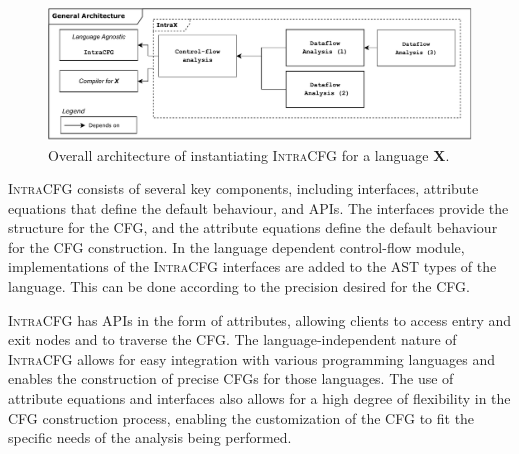 \begin{figure}[H]
    \centering
    \includegraphics[width=1\textwidth]{kappa/img/architecture.pdf}
    \caption{\label{fig:intraCFG} Overall architecture of instantiating \textsc{IntraCFG} for a language \textbf{X}.}
\end{figure}

\textsc{IntraCFG} consists of several key components, including interfaces, attribute equations that define the
default behaviour, and APIs. The interfaces provide the structure for the
CFG, and the attribute equations define the default behaviour for the CFG
construction. 
In the language dependent control-flow module, implementations of the \textsc{IntraCFG}
interfaces are added to the AST types of the language. This can be done according to the
precision desired for the CFG.

\textsc{IntraCFG} has APIs in the form of attributes, allowing clients to access entry
and exit nodes and to traverse the CFG.
The language-independent nature of \textsc{IntraCFG} allows for easy integration
with various programming languages and enables the construction of precise CFGs
for those languages. The use of attribute equations and interfaces also allows
for a high degree of flexibility in the CFG construction process,
enabling the customization of the CFG to fit the specific needs of the
analysis being performed.






